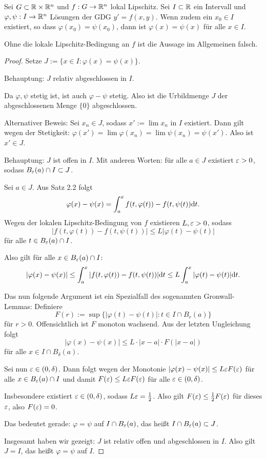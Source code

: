 \begin{thm}
  Sei $G \subset \mathbb{R} \times \mathbb{R}^n$ und $f: G \to \mathbb{R}^n$ lokal
  Lipschitz. Sei $I \subset \mathbb{R}$ ein Intervall und $\varphi, \psi: I \to
  \mathbb{R}^n$ Lösungen der GDG $y' = f(x,y)$. Wenn zudem ein $x_0 \in I$ existiert,
  so dass $\varphi(x_0) = \psi(x_0)$, dann ist $\varphi(x) = \psi(x)$ für alle
  $x \in I$.
\end{thm}

\begin{rmrk}
  Ohne die lokale Lipschitz-Bedingung an $f$ ist die Aussage im Allgemeinen
  falsch.
\end{rmrk}

\begin{proof}
  Setze $J := \{x \in I: \varphi(x) = \psi(x) \}$.

  Behauptung: $J$ relativ abgeschlossen in $I$.

  Da $\varphi, \psi$ stetig ist, ist auch $\varphi-\psi$ stetig. Also ist die
  Urbildmenge $J$ der abgeschlossenen Menge $\{0\}$ abgeschlossen.

  Alternativer Beweis: Sei $x_n \in J$, sodass $x' := \lim x_n$ in $I$
  existiert. Dann gilt wegen der Stetigkeit: $\varphi(x') = \lim \varphi(x_n) =
  \lim \psi(x_n) = \psi(x')$. Also ist $x' \in J$.

  Behauptung: $J$ ist offen in $I$. Mit anderen Worten: für alle $a \in J$
  existiert $\varepsilon > 0$, sodass $B_\varepsilon(a) \cap I \subset J$.

  Sei $a \in J$. Aus Satz 2.2 folgt
  \[ \varphi(x) - \psi(x) = \int_a^x f(t,\varphi(t)) - f(t,\psi(t)) \mathrm{d}
    t. \]
  Wegen der lokalen Lipschitz-Bedingung von $f$ existieren $L, \varepsilon > 0$, sodass
  \[ |f(t,\varphi(t)) - f(t,\psi(t)) | \le L |\varphi(t) - \psi(t)| \]
  für alle $t \in B_\varepsilon(a) \cap I$.

  Also gilt für alle $x \in B_\varepsilon(a) \cap I$:
  \[ | \varphi(x) - \psi(x) | \le \int_a^x |f(t,\varphi(t)) - f(t,\psi(t))|
    \mathrm{d} t \le L \int_a^x | \varphi(t) - \psi(t) | \mathrm{d} t. \]

  Das nun folgende Argument ist ein Spezialfall des sogenannten Gronwall-Lemmas:
  Definiere
  \[ F(r) := \sup \{ | \varphi(t) - \psi(t) | : t \in I \cap B_r(a) \} \]
  für $r > 0$. Offensichtlich ist $F$ monoton wachsend. Aus der letzten
  Ungleichung folgt
  \[ | \varphi(x) - \psi(x) | \le L \cdot |x-a| \cdot F( |x-a| ) \]
  für alle $x \in I \cap B_\delta(a)$.

  Sei nun $\varepsilon \in (0,\delta)$. Dann folgt wegen der Monotonie $|\varphi(x) -
  \psi(x) | \le L \varepsilon F(\varepsilon)$ für alle $x \in B_\varepsilon(a) \cap I$ und damit
  $F(\varepsilon) \le L \varepsilon F(\varepsilon)$ für alle $\varepsilon \in (0,\delta)$.

  Insbesondere existiert $\varepsilon \in (0,\delta)$, sodass $L \varepsilon = \frac{1}{2}$. Also
  gilt $F(\varepsilon) \le \frac{1}{2} F(\varepsilon)$ für dieses $\varepsilon$, also $F(\varepsilon)=0$.

  Das bedeutet gerade: $\varphi = \psi$ auf $I \cap B_\varepsilon(a)$, das heißt $I
  \cap B_\varepsilon(a) \subset J$.

  Insgesamt haben wir gezeigt: $J$ ist relativ offen und abgeschlossen in $I$.
  Also gilt $J=I$, das heißt $\varphi = \psi$ auf $I$.
\end{proof}

